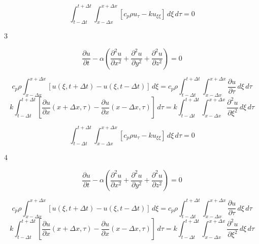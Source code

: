 \documentclass{article}
\begin{document}
\begin{equation}
\int_{t-\Delta t}^{t+\Delta t}\int_{x-\Delta x}^{x+\Delta x} [c_p\rho u_\tau - k u_{\xi\xi}]\, d\xi \, d\tau = 0
\end{equation}

\newpage

\begin{center}
\Huge{3}
\end{center}

\vskip 2cm
\begin{equation}
\frac{\partial u}{\partial t} -\alpha\left(\frac{\partial^2u}{\partial x^2}+\frac{\partial^2u}{\partial y^2}+\frac{\partial^2u}{\partial z^2}\right)=0
\end{equation}

\begin{equation}
c_p\rho \int_{x-\Delta x}^{x+\Delta x} [u(\xi,t+\Delta t)-u(\xi,t-\Delta t)]\, d\xi = c_p\rho\int_{t-\Delta t}^{t+\Delta t}\int_{x-\Delta x}^{x+\Delta x} \frac{\partial u}{\partial\tau}\,d\xi \, d\tau
\end{equation}
\begin{equation}
k\int_{t-\Delta t}^{t+\Delta t}\left[\frac{\partial u}{\partial x}(x+\Delta x,\tau)-\frac{\partial u}{\partial x}(x-\Delta x,\tau)\right]\,d\tau = k\int_{t-\Delta t}^{t+\Delta t}\int_{x-\Delta x}^{x+\Delta x}\frac{\partial^2u}{\partial\xi^2}\,d\xi\, d\tau
\end{equation}

\begin{equation}
\int_{t-\Delta t}^{t+\Delta t}\int_{x-\Delta x}^{x+\Delta x} [c_p\rho u_\tau - k u_{\xi\xi}]\, d\xi \, d\tau = 0
\end{equation}

\newpage

\begin{center}
\Huge{4}
\end{center}

\vskip 2cm
\begin{equation}
\frac{\partial u}{\partial t} -\alpha\left(\frac{\partial^2u}{\partial x^2}+\frac{\partial^2u}{\partial y^2}+\frac{\partial^2u}{\partial z^2}\right)=0
\end{equation}

\begin{equation}
c_p\rho \int_{x-\Delta x}^{x+\Delta x} [u(\xi,t+\Delta t)-u(\xi,t-\Delta t)]\, d\xi = c_p\rho\int_{t-\Delta t}^{t+\Delta t}\int_{x-\Delta x}^{x+\Delta x} \frac{\partial u}{\partial\tau}\,d\xi \, d\tau
\end{equation}
\begin{equation}
k\int_{t-\Delta t}^{t+\Delta t}\left[\frac{\partial u}{\partial x}(x+\Delta x,\tau)-\frac{\partial u}{\partial x}(x-\Delta x,\tau)\right]\,d\tau = k\int_{t-\Delta t}^{t+\Delta t}\int_{x-\Delta x}^{x+\Delta x}\frac{\partial^2u}{\partial\xi^2}\,d\xi\, d\tau
\end{equation}
\end{document}

